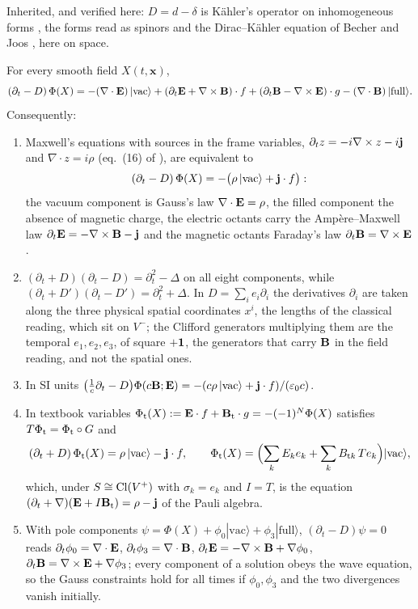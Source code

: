Inherited, and verified here: $D=d-\delta$ is K\"ahler's operator on inhomogeneous forms \cite{Kahler62}, the forms read as spinors \cite{Graf78}
and the Dirac--K\"ahler equation of Becher and Joos \cite{BecherJoos82}, here on space.

\begin{theorem}
\label{r3:thm:maxwell}
For every smooth field $X(t,\mathbf x)$,
\begin{equation}
\label{r3:eq:maxwell}
(\partial_t-D)\,\Phi(X)=-(\nabla\cdot\mathbf E)\,|\mathrm{vac}\rangle+(\partial_t\mathbf E+\nabla\times\mathbf B)\cdot f+(\partial_t\mathbf B-\nabla\times\mathbf E)\cdot g-(\nabla\cdot\mathbf B)\,|\mathrm{full}\rangle .
\end{equation}
Consequently:
\begin{enumerate}[label=(\roman*),leftmargin=2.2em]
\item Maxwell's equations with sources in the frame variables, $\partial_tz=-i\nabla\times z-i\mathbf j$ and $\nabla\cdot z=i\rho$ (eq.~(16) of \cite{ES17}), are equivalent to
\[
(\partial_t-D)\,\Phi(X)=-\bigl(\rho\,|\mathrm{vac}\rangle+\mathbf j\cdot f\bigr):
\]
the vacuum component is Gauss's law $\nabla\cdot\mathbf E=\rho$, the filled component the absence of magnetic charge, the electric octants carry the
Amp\`ere--Maxwell law $\partial_t\mathbf E=-\nabla\times\mathbf B-\mathbf j$ and the magnetic octants Faraday's law $\partial_t\mathbf B=\nabla\times\mathbf E$.
\item $(\partial_t+D)(\partial_t-D)=\partial_t^2-\Delta$ on all eight components, while $(\partial_t+D')(\partial_t-D')=\partial_t^2+\Delta$. In $D=\sum_ie_i\partial_i$ the
derivatives $\partial_i$ are taken along the three physical spatial coordinates $x^i$, the lengths of the classical reading, which sit on $V^-$;
the Clifford generators multiplying them are the temporal $e_1,e_2,e_3$, of square $+\mathbf 1$, the generators that carry $\mathbf B$ in the field reading,
and not the spatial ones.
\item In SI units $\bigl(\tfrac1c\partial_t-D\bigr)\Phi(c\mathbf B;\mathbf E)=-(c\rho\,|\mathrm{vac}\rangle+\mathbf j\cdot f)/(\varepsilon_0c)$.
\item In textbook variables $\Phi_{\rm t}(X):=\mathbf E\cdot f+\mathbf B_{\rm t}\cdot g=-(-1)^N\Phi(X)$ satisfies $T\Phi_{\rm t}=\Phi_{\rm t}\circ G$ and
\[
(\partial_t+D)\,\Phi_{\rm t}(X)=\rho\,|\mathrm{vac}\rangle-\mathbf j\cdot f,\qquad \Phi_{\rm t}(X)=\Bigl(\sum_kE_ke_k+\sum_kB_{{\rm t}k}\,Te_k\Bigr)|\mathrm{vac}\rangle ,
\]
which, under $S\cong\mathrm{Cl}(V^+)$ with $\sigma_k=e_k$ and $I=T$, is the equation $(\partial_t+\nabla)(\mathbf E+I\mathbf B_{\rm t})=\rho-\mathbf j$ of the Pauli algebra.
\item With pole components $\psi=\Phi(X)+\phi_0|\mathrm{vac}\rangle+\phi_3|\mathrm{full}\rangle$, $(\partial_t-D)\psi=0$ reads $\partial_t\phi_0=\nabla\cdot\mathbf E$, $\partial_t\phi_3=\nabla\cdot\mathbf B$,
$\partial_t\mathbf E=-\nabla\times\mathbf B+\nabla\phi_0$, $\partial_t\mathbf B=\nabla\times\mathbf E+\nabla\phi_3$; every component of a solution obeys the wave equation, so the Gauss constraints
hold for all times if $\phi_0,\phi_3$ and the two divergences vanish initially.
\end{enumerate}
\end{theorem}

